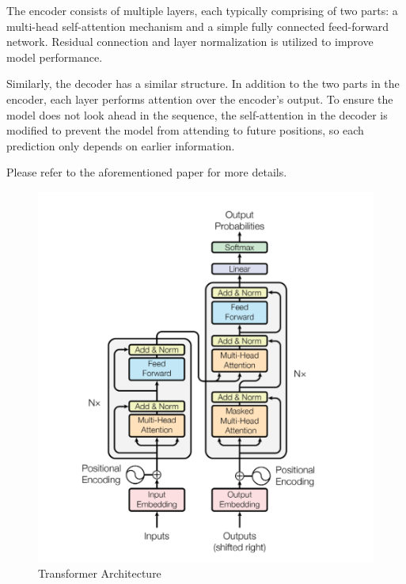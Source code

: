 \documentclass[licencjacka,en]{pracamgr}
\begin{document}
The encoder consists of multiple layers, each typically comprising of two parts: a multi-head self-attention mechanism and a simple fully connected feed-forward network. Residual connection and layer normalization is utilized to improve model performance.

Similarly, the decoder has a similar structure. In addition to the two parts in the encoder, each layer performs attention over the encoder’s output. To ensure the model does not look ahead in the sequence, the self-attention in the decoder is modified to prevent the model from attending to future positions, so each prediction only depends on earlier information.

Please refer to the aforementioned paper for more details.

\begin{figure}
    \centering
    \includegraphics[width=0.5\linewidth]{bachelor_images/transformer_arch.png}
    \caption{Transformer Architecture \cite{attention}}
    \label{fig:transformers_fig}
\end{figure}
\end{document}
